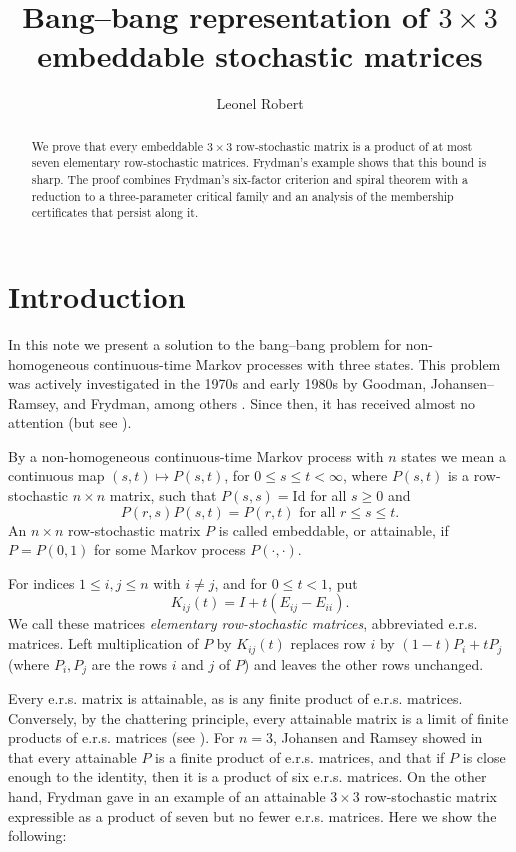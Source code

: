 \documentclass[11pt,onecolumn]{amsart}
\title{Bang--bang representation of $3\times 3$ embeddable stochastic matrices}
\author{Leonel Robert}
\theoremstyle{plain}
\theoremstyle{definition}
\theoremstyle{remark}
\begin{document}
\begin{abstract}
	We prove that every embeddable $3\times3$ row-stochastic matrix is a
	product of at most seven elementary row-stochastic matrices. Frydman's
	example shows that this bound is sharp. The proof combines Frydman's
	six-factor criterion and spiral theorem with a reduction to a
	three-parameter critical family and an analysis of the membership
	certificates that persist along it.
\end{abstract}

\maketitle
\section{Introduction}
In this note we present a solution to the bang--bang problem for
non-homogeneous continuous-time Markov processes with three states. This problem
was actively investigated in the 1970s and early 1980s by Goodman,
Johansen--Ramsey, and Frydman, among others
\cite{Goodman1970,JohansenRamsey1979,FrydmanSinger1979,FrydmanEmbedding1980,Frydman1980,Frydman1983}.
Since then, it has received almost no attention (but see \cite{BaakeSumner2024,Singer2025}).

By a non-homogeneous continuous-time Markov process with $n$ states we mean a continuous map $(s,t)\mapsto P(s,t)$, for $0\leq s\leq t<\infty$, 
where $P(s,t)$ is a row-stochastic $n\times n$ matrix, such that $P(s,s)=\mathrm{Id}$ for all $s\geq 0$ and
\[
P(r,s)P(s,t)=P(r,t)\text{ for all }r\leq s\leq t.
\]
 An $n\times n$ row-stochastic matrix $P$ is called embeddable, or attainable, if  $P=P(0,1)$ for some  Markov process $P(\cdot,\cdot)$.


For indices $1\leq i,j\leq n$ with $i\neq j$, and for $0\leq t<1$, put
\[
K_{ij}(t)=I+t(E_{ij}-E_{ii}).
\]
 We call these matrices \emph{elementary row-stochastic matrices}, abbreviated e.r.s. matrices. 
Left multiplication of $P$ by $K_{ij}(t)$ replaces row $i$ by
$(1-t)P_i+tP_j$ (where $P_i,P_j$ are the rows $i$ and $j$ of $P$) and leaves the other rows unchanged. 

Every e.r.s. matrix is attainable, as is any finite product of e.r.s. matrices.
Conversely, by the chattering principle, every attainable matrix is a limit of finite products of e.r.s.
matrices (see \cite{JohansenCLT, Sussmann1972}). For $n=3$, Johansen and
Ramsey showed in \cite{JohansenRamsey1979} that every attainable $P$ is a finite
product of e.r.s. matrices,
and that if $P$ is close enough to the identity, then it is a product of six e.r.s. matrices. On the other hand,
Frydman gave in \cite{Frydman1983} an example of an attainable $3\times 3$ row-stochastic matrix expressible as a product of seven
but no fewer e.r.s. matrices. Here we show the following:
\end{document}
